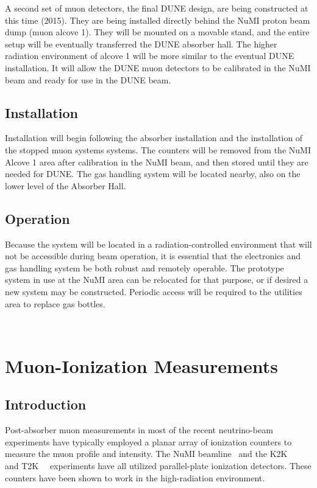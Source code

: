 A second set of muon detectors, the final DUNE design, are being constructed at this time (2015). They are being installed directly behind the NuMI proton beam dump (muon alcove 1). They will be mounted on a movable stand, and the entire setup will be eventually transferred the DUNE absorber hall. The higher radiation environment of alcove 1 will be more similar to the eventual DUNE installation. It will allow the DUNE muon detectors to be calibrated in the NuMI beam and ready for use in the DUNE beam.
\subsection{Installation}

Installation will begin following the absorber installation and the installation of the stopped muon systems
systems. The counters will be removed from the NuMI Alcove 1 area after calibration in the NuMI beam, and then 
stored until they are needed for DUNE. 
The gas handling system will be located nearby, also on the lower level of the Absorber Hall.

\subsection{Operation}

Because the system will be located in a radiation-controlled
environment that will not be accessible during beam operation, it is
essential that the electronics and gas handling system be both robust
and remotely operable.  The prototype system in use at the NuMI area can be relocated for that purpose,
or if desired a new system may be constructed.
Periodic access will be required to the utilities area to replace gas bottles.

%
%
\
\section{Muon-Ionization Measurements}
\label{sec:nd-blm-muon-ionization}

\subsection{Introduction}

Post-absorber muon measurements in most of the recent neutrino-beam
experiments have typically employed a planar array of ionization
counters to measure the muon profile and intensity. The 
NuMI beamline~\cite{ref:NuMIBeamMonitors} and the K2K~\cite{ref:K2K}~\cite{ref:Maruyama}
and T2K~\cite{ref:T2KMuIon}~\cite{ref:T2KMuMon} experiments have all
utilized parallel-plate ionization detectors. These counters have been
shown to work in the high-radiation environment. 

